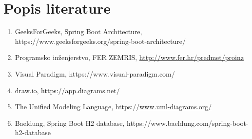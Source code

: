 \chapter*{Popis literature}
		
		\begin{enumerate}
			
			\item GeeksForGeeks, Spring Boot Architecture, https://www.geeksforgeeks.org/spring-boot-architecture/
			
			\item  Programsko inženjerstvo, FER ZEMRIS, \url{http://www.fer.hr/predmet/proinz}
			
			\item Visual Paradigm, https://www.visual-paradigm.com/
			
			\item draw.io, https://app.diagrams.net/
			
			\item  The Unified Modeling Language, \url{https://www.uml-diagrams.org/}
			
			\item Baeldung, Spring Boot H2 database, https://www.baeldung.com/spring-boot-h2-database
			
		\end{enumerate}
		
		 